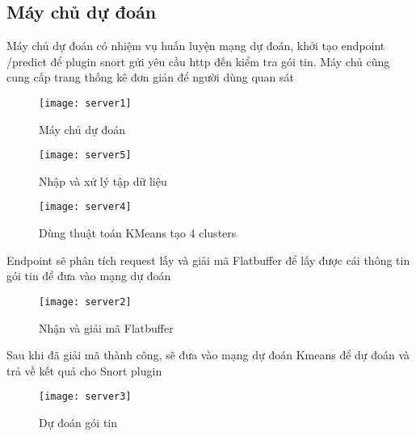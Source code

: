 \subsection{Máy chủ dự đoán}
Máy chủ dự đoán có nhiệm vụ huấn luyện mạng dự đoán, khởi tạo endpoint /predict để plugin snort gửi yêu cầu http đến kiểm tra gói tin.
Máy chủ cũng cung cấp trang thống kê đơn giản để người dùng quan sát
\begin{figure}[!htbp]
    \centering
    \texttt{[image: server1]}
    \caption{Máy chủ dự đoán}
    \label{fig:x cubed graph}
\end{figure}
\FloatBarrier
\begin{figure}[!htbp]
    \centering
    \texttt{[image: server5]}
    \caption{Nhập và xử lý tập dữ liệu}
    \label{fig:x cubed graph}
\end{figure}
\FloatBarrier
\begin{figure}[!htbp]
    \centering
    \texttt{[image: server4]}
    \caption{Dùng thuật toán KMeans tạo 4 clusters}
    \label{fig:x cubed graph}
\end{figure}
\FloatBarrier
Endpoint sẽ phân tích request lấy và giải mã Flatbuffer để lấy được cái thông tin gói tin để đưa vào mạng dự đoán
\begin{figure}[!htbp]
    \centering
    \texttt{[image: server2]}
    \caption{Nhận và giải mã Flatbuffer}
    \label{fig:x cubed graph}
\end{figure}
\FloatBarrier
Sau khi đã giải mã thành công, sẽ đưa vào mạng dự đoán Kmeans để dự đoán và trả về kết quả cho Snort plugin
\begin{figure}[!htbp]
    \centering
    \texttt{[image: server3]}
    \caption{Dự đoán gói tin}
    \label{fig:x cubed graph}
\end{figure}
\FloatBarrier
